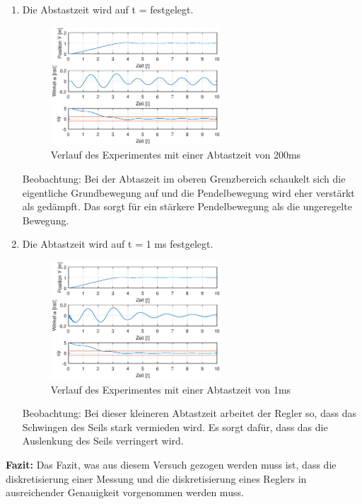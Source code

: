 \documentclass[10pt]{scrartcl}
\begin{document}
\begin{enumerate}
\item Die Abstastzeit wird auf t = festgelegt.
\begin{figure}[H]
	\centering
	\includegraphics[width=0.6\textwidth]{Figure45a200mT}
	\caption{Verlauf des Experimentes mit einer Abtastzeit von 200ms}
	\label{img:grafik-dummy}
\end{figure}
Beobachtung:
Bei der Abtaszeit im oberen Grenzbereich schaukelt sich die eigentliche Grundbewegung auf und die Pendelbewegung wird eher verstärkt als gedämpft. Das sorgt für ein stärkere Pendelbewegung als die ungeregelte Bewegung. 
\item Die Abtastzeit wird auf t = 1 ms festgelegt.
\begin{figure}[H]
	\centering
	\includegraphics[width=0.6\textwidth]{45a1mT}
	\caption{Verlauf des Experimentes mit einer Abtastzeit von 1ms}
	\label{img:grafik-dummy}
\end{figure}
Beobachtung: 
Bei dieser kleineren Abtastzeit arbeitet der Regler so, dass das Schwingen des Seils stark vermieden wird. Es sorgt dafür, dass das die Auslenkung des Seils verringert wird.
\end{enumerate}
\textbf { Fazit:} Das Fazit, was aus diesem Versuch gezogen werden muss ist, dass die diskretisierung einer Messung und die diskretisierung eines Reglers in ausreichender Genauigkeit vorgenommen werden muss.
\end{document}
